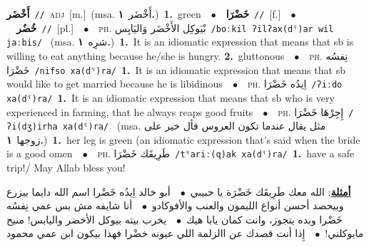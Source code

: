 \documentclass[10pt,a4paper,twoside]{article} %
\begin{document}
\begin{multicols}{2}
{\setlength\topsep{0pt}\textbf{\foreignlanguage{arabic}{أَخْضَر}}\ {\color{gray}\texttt{//}\color{black}}\ \textsc{adj}\ [m.]\ \color{gray}(msa. \foreignlanguage{arabic}{أَخْضَر}~\foreignlanguage{arabic}{\textbf{١.}})\color{black}\ \textbf{1.}~green\ \ $\bullet$\ \ \setlength\topsep{0pt}\textbf{\foreignlanguage{arabic}{خَضْرَا}}\ {\color{gray}\texttt{//}\color{black}}\ [f.]\ \ $\bullet$\ \ \setlength\topsep{0pt}\textbf{\foreignlanguage{arabic}{خُضُر}}\ {\color{gray}\texttt{//}\color{black}}\ [pl.]\ \ $\bullet$\ \ \textsc{ph.} \color{gray} \foreignlanguage{arabic}{بْيَوكِل الأَخْضَر وَاليَابِس}\color{black}\ {\color{gray}\texttt{/{\sffamily boːkil ʔilʔax(dˤ)ar wil jaːbis}/}\color{black}}\ \color{gray} (msa. \foreignlanguage{arabic}{شرِه}~\foreignlanguage{arabic}{\textbf{١.}})\color{black}\ \textbf{1.}~It is an idiomatic expression that means that sb is willing to eat anything because he/she is hungry.  \textbf{2.}~gluttonous\ \ $\bullet$\ \ \textsc{ph.} \color{gray} \foreignlanguage{arabic}{نِفسُه خَضْرَا}\color{black}\ {\color{gray}\texttt{/{\sffamily nifso xa(dˤ)ra}/}\color{black}}\ \textbf{1.}~It is an idiomatic expression that means that sb would like to get married because he is libidinous\ \ $\bullet$\ \ \textsc{ph.} \color{gray} \foreignlanguage{arabic}{اِيدُه خَضْرَا}\color{black}\ {\color{gray}\texttt{/{\sffamily ʔiːdo xa(dˤ)ra}/}\color{black}}\ \textbf{1.}~It is an idiomatic expression that means that sb who is very experienced in farming, that he always reaps good fruits\ \ $\bullet$\ \ \textsc{ph.} \color{gray} \foreignlanguage{arabic}{إِجِرْهَا خَضْرَا}\color{black}\ {\color{gray}\texttt{/{\sffamily ʔi(dʒ)irha xa(dˤ)ra}/}\color{black}}\ \color{gray} (msa. \foreignlanguage{arabic}{مثل يقال عندما تكون العروس فأل خير على زوجها}~\foreignlanguage{arabic}{\textbf{١.}})\color{black}\ \textbf{1.}~her leg is green (an idiomatic expression that's said when the bride is a good omen\ \ $\bullet$\ \ \textsc{ph.} \color{gray} \foreignlanguage{arabic}{طَرِيقَك خَضْرَا}\color{black}\ {\color{gray}\texttt{/{\sffamily tˤariː(q)ak xa(dˤ)ra}/}\color{black}}\ \textbf{1.}~have a safe trip!/ May Allab bless you!\  \begin{flushright}\color{gray}\foreignlanguage{arabic}{\textbf{\underline{\foreignlanguage{arabic}{أمثلة}}}: الله معك طَرِيقَك خَضْرَة يا حبيبي\ $\bullet$\ \  أبو خالد اِيدُه خَضْرا اسم الله دايما بيزرع وبيحصد أحسن أنواع الليمون والعنب والأفوكادو\ $\bullet$\ \  أنا شايفه مش بس عمي نِفسُه خَضْرا وبده يتجوز، وانت كمان يابا هيك\ $\bullet$\ \  يخرب بيته بيوكل الأخضر واليابس! منيح مايوكلني!\ $\bullet$\ \  إِذا أنت قصدك عن االزلمة اللي عيونه خضْرا  فهذا بيكون ابن عمي محمود}\end{flushright}\color{black}} \vspace{2mm}


\end{multicols}
\end{document}
